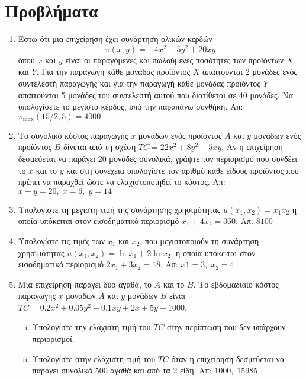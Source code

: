 \section*{Προβλήματα}

\begin{enumerate}
  \item Έστω ότι μια επιχείρηση έχει συνάρτηση ολικών κερδών
    \[
      \pi (x,y) = -4x^{2}-5y^{2}+20xy
    \] 
    όπου $ x $ και $ y $ είναι οι παραγόμενες και πωλούμενες ποσότητες των προϊόντων 
    $ X $ και $ Y $. Για την παραγωγή κάθε μονάδας προϊόντος $X$ απαιτούνται 2 μονάδες 
    ενός συντελεστή παραγωγής και για την παραγωγή κάθε μονάδας προϊόντος $Y$ 
    απαιτούνται 5 μονάδες του συντελεστή αυτού που διατίθεται σε 40 μονάδες. Να 
    υπολογίσετε το μέγιστο κέρδος, υπό την παραπάνω συνθήκη.
    \hfill Απ: $ \pi_{\max}(15/2,5)=4000 $ 

  \item Το συνολικό κόστος παραγωγής $x$ μονάδων ενός προϊόντος $A$ και $y$ μονάδων ενός 
    προϊόντος $B$ δίνεται από τη σχέση $ TC = 22x^{2} + 8 y^{2} - 5xy $. Αν η επιχείρηση 
    δεσμεύεται να παράγει 20 μονάδες συνολικά, γράψτε τον περιορισμό που συνδέει το 
    $x$ και το $y$ και στη συνέχεια υπολογίστε τον αριθμό κάθε είδους προϊόντος που 
    πρέπει να παραχθεί ώστε να ελαχιστοποιηθεί το κόστος.
    \hfill Απ: $ x+y=20, \; x=6, \; y=14 $

  \item Υπολογίστε τη μέγιστη τιμή της συνάρτησης χρησιμότητας 
    $ u(x_{1}, x_{2}) = x_{1} x_{2} $ η οποία  υπόκειται στον εισοδηματικό περιορισμό 
    $ x_{1}+4 x_{2}=360 $.
    \hfill Απ: $ 8100 $

  \item Υπολογίστε τις τιμές των $ x_{1} $ και $ x_{2} $, που μεγιστοποιούν τη 
    συνάρτηση χρησιμότητας $ u(x_{1}, x_{2}) = \ln{x_{1}} + 2 \ln{x_{2}} $, η οποία  
    υπόκειται στον εισοδηματικό περιορισμό $ 2x_{1}+3 x_{2}=18 $.
    \hfill Απ: $x1 = 3, \; x_{2}=4$

  \item Μια επιχείρηση παράγει δύο αγαθά, το $A$ και το $B$. Το εβδομαδιαίο κόστος
    παραγωγής $x$ μονάδων $A$ και $y$ μονάδων $B$ είναι $ TC=0.2 x^{2}+0.05y^{2} +0.1xy
    +2x+5y+1000 $.
    \begin{enumerate}[i)]
      \item Υπολογίστε την ελάχιστη τιμή του $ TC $ στην περίπτωση που δεν υπάρχουν 
        περιορισμοί.
      \item Υπολογίστε στην ελάχιστη τιμή του $ TC $ όταν η επιχείρηση δεσμεύεται να 
        παράγει συνολικά 500 αγαθά και από τα 2 είδη.
        \hfill Απ: $1000, \; 15985$
    \end{enumerate}


\end{enumerate}
